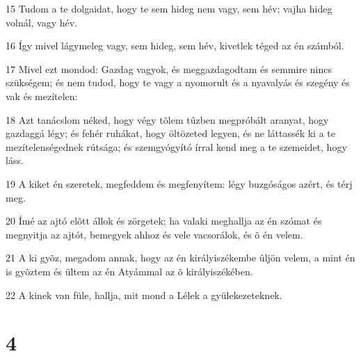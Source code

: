 \par 15 Tudom a te dolgaidat, hogy te sem hideg nem vagy, sem hév; vajha hideg volnál, vagy hév.
\par 16 Így mivel lágymeleg vagy, sem hideg, sem hév, kivetlek téged az én számból.
\par 17 Mivel ezt mondod: Gazdag vagyok, és meggazdagodtam és semmire nincs szükségem; és nem tudod, hogy te vagy a nyomorult és a nyavalyás és szegény és vak és mezítelen:
\par 18 Azt tanácslom néked, hogy végy tõlem tûzben megpróbált aranyat, hogy gazdaggá légy; és fehér ruhákat, hogy öltözeted legyen, és ne láttassék ki a te mezítelenségednek rútsága; és szemgyógyító írral kend meg a te szemeidet, hogy láss.
\par 19 A kiket én szeretek, megfeddem és megfenyítem: légy buzgóságos azért, és térj meg.
\par 20 Ímé az ajtó elõtt állok és zörgetek; ha valaki meghallja az én szómat és megnyitja az ajtót, bemegyek ahhoz és vele vacsorálok, és õ én velem.
\par 21 A ki gyõz, megadom annak, hogy az én királyiszékembe ûljön velem, a mint én is gyõztem és ültem az én Atyámmal az õ királyiszékében.
\par 22 A kinek van füle, hallja, mit mond a Lélek a gyülekezeteknek.

\chapter{4}

